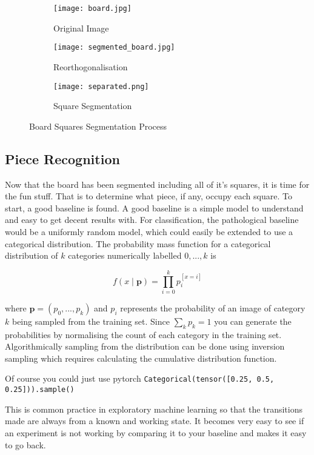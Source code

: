 \begin{figure}[h]
    \centering
    \begin{subfigure}[b]{0.32\textwidth}
        \centering
        \texttt{[image: board.jpg]}
        \caption{Original Image}
    \end{subfigure}
    \hfill
    \begin{subfigure}[b]{0.32\textwidth}
        \centering
        \texttt{[image: segmented\_board.jpg]}
        \caption{Reorthogonalisation}
    \end{subfigure}
    \hfill
    \begin{subfigure}[b]{0.32\textwidth}
        \centering
        \texttt{[image: separated.png]}
        \caption{Square Segmentation}
    \end{subfigure}
\caption{Board Squares Segmentation Process}
\label{fig:corner}
\end{figure}
    

\subsection{Piece Recognition}
Now that the board has been segmented including all of it's squares, it is time for the fun stuff.  That is
to determine what piece, if any, occupy each square.  To start, a good baseline is found.  
A good baseline is a simple model to understand and easy to get decent results with.
For classification, the pathological baseline would be a uniformly random model, which could easily be extended to use a categorical distribution.
The probability mass function for a categorical distribution of $k$ categories numerically labelled $0, ..., k$ is

$$ f(x \;|\; \bm{p}) = \prod\limits_{i=0}^{k}{p_i^{[x=i]}} $$

where $\bm{p} = (p_0, ..., p_k)$ and $p_i$ represents the probability of an image of category $k$ being sampled from the training set.
Since $\sum_{k}{p_k} = 1$ you can generate the probabilities by normalising the count of each category in the training set.  Algorithmically 
sampling from the distribution can be done using inversion sampling which requires calculating the cumulative distribution function.

Of course you could just use pytorch \cite{} \verb|Categorical(tensor([0.25, 0.5, 0.25])).sample()|

This is common practice in exploratory machine learning \cite{} so that the transitions
made are always from a known and working state.  It becomes very easy to see if an experiment is not working by comparing it to your baseline and 
makes it easy to go back.

